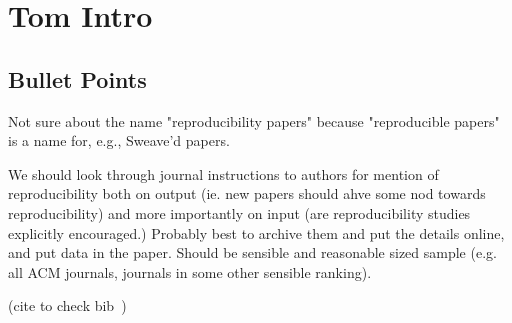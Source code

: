 \documentclass[a4paper,11pt]{article}
\begin{document}
\section{Tom Intro}

\subsection{Bullet Points}
Not sure about the name "reproducibility papers" because "reproducible
papers" is a name for, e.g., Sweave'd papers.

We should look through journal instructions to authors for mention of
reproducibility both on output (ie. new papers should ahve some nod
towards reproducibility) and more importantly on input (are
reproducibility studies explicitly encouraged.)  Probably best to
archive them and put the details online, and put data in the
paper. Should be sensible and reasonable sized sample (e.g. all ACM
journals, journals in some other sensible ranking).

(cite to check bib~\cite{crick-et-al_wssspe2})
\end{document}
